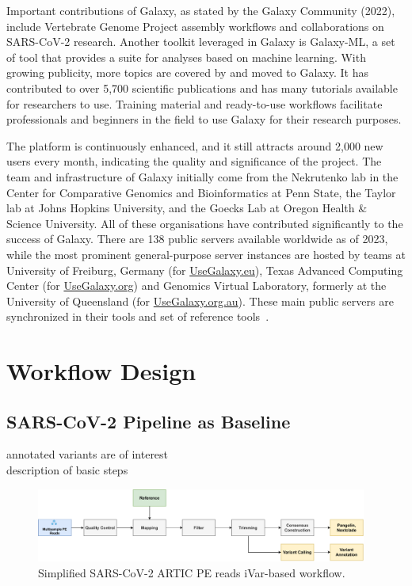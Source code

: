 Important contributions of Galaxy, as stated by the Galaxy Community (2022), include Vertebrate Genome Project assembly workflows and collaborations on SARS-CoV-2 research. Another toolkit leveraged in Galaxy is Galaxy-ML, a set of tool that provides a suite for analyses based on machine learning. With growing publicity, more topics are covered by and moved to Galaxy. It has contributed to over 5,700 scientific publications and has many tutorials available for researchers to use. Training material and ready-to-use workflows facilitate professionals and beginners in the field to use Galaxy for their research purposes.

The platform is continuously enhanced, and it still attracts around 2,000 new users every month, indicating the quality and significance of the project. The team and infrastructure of Galaxy initially come from the Nekrutenko lab in the Center for Comparative Genomics and Bioinformatics at Penn State, the Taylor lab at Johns Hopkins University, and the Goecks Lab at Oregon Health \& Science University. All of these organisations have contributed significantly to the success of Galaxy. There are 138 public servers available worldwide as of 2023, while the most prominent general-purpose server instances are hosted by teams at University of Freiburg, Germany (for \href{https://usegalaxy.eu/}{UseGalaxy.eu}), Texas Advanced Computing Center (for \href{https://usegalaxy.org/}{UseGalaxy.org}) and Genomics Virtual Laboratory, formerly at the University of Queensland (for \href{https://usegalaxy.org.au/}{UseGalaxy.org.au}). These main public servers are synchronized in their tools and set of reference tools~\cite{10.1093/nar/gkac247}.


\section{Workflow Design}

\subsection{SARS-CoV-2 Pipeline as Baseline}
annotated variants are of interest \\
description of basic steps

\begin{figure}
	\centering
	\includegraphics[width=0.97\textwidth]{media/3-pipelines-SARS-CoV-2.pdf}
	\caption{Simplified SARS-CoV-2 ARTIC PE reads iVar-based workflow.}
	\label{fig:3-pipelines-sars}
\end{figure}

